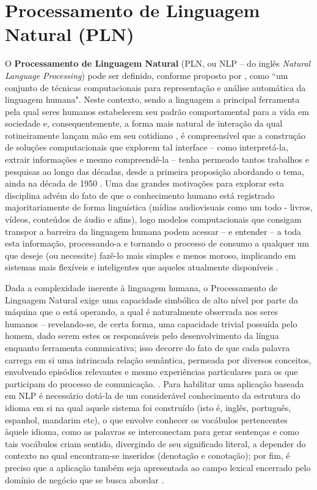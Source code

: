 \section{Processamento de Linguagem Natural (PLN)}
\label{sec:npl}

O \textbf{Processamento de Linguagem Natural} (PLN, ou NLP -- do inglês \textit{Natural Language Processing}) pode ser definido, conforme proposto por , como ``um conjunto de técnicas computacionais para representação e análise automática da linguagem humana". Neste contexto, sendo a linguagem a principal ferramenta pela qual seres humanos estabelecem seu padrão comportamental para a vida em sociedade e, consequentemente, a forma mais natural de interação da qual rotineiramente lançam mão em seu cotidiano \cite{allen1988natural}, é compreensível que a construção de soluções computacionais que explorem tal interface -- como interpretá-la, extrair informações e mesmo compreendê-la -- tenha permeado tantos trabalhos e pesquisas ao longo das décadas, desde a primeira proposição abordando o tema, ainda na década de 1950 \cite{cambria2014jumping}. Uma das grandes motivações para explorar esta disciplina advém do fato de que o conhecimento humano está registrado majoritariamente de forma linguística (mídias audiovisuais como um todo - livros, vídeos, conteúdos de áudio e afins), logo modelos computacionais que consigam transpor a barreira da linguagem humana podem acessar -- e entender -- a toda esta informação, processando-a e tornando o processo de consumo a qualquer um que deseje (ou necessite) fazê-lo mais simples e menos moroso, implicando em sistemas mais flexíveis e inteligentes que aqueles atualmente disponíveis \cite{allen1988natural}.

Dada a complexidade inerente à linguagem humana, o Processamento de Linguagem Natural exige uma capacidade simbólica de alto nível por parte da máquina que o está operando, a qual é naturalmente observada nos seres humanos -- revelando-se, de certa forma, uma capacidade trivial possuída pelo homem, dado serem estes os responsáveis pelo desenvolvimento da língua enquanto ferramenta comunicativa; isso decorre do fato de que cada palavra carrega em si uma intrincada relação semântica, permeada por diversos conceitos, envolvendo episódios relevantes e mesmo experiências particulares para os que participam do processo de comunicação. \cite{cambria2014jumping}. Para habilitar uma aplicação baseada em NLP é necessário dotá-la de um considerável conhecimento da estrutura do idioma em si na qual aquele sistema foi construído (isto é, inglês, português, espanhol, mandarim etc), o que envolve conhecer os vocábulos pertencentes àquele idioma, como as palavras se interconectam para gerar sentenças e como tais vocábulos criam sentido, divergindo de seu significado literal, a depender do contexto no qual encontram-se inseridos (denotação e conotação); por fim, é preciso que a aplicação também seja apresentada ao campo lexical encerrado pelo domínio de negócio que se busca abordar \cite{allen1988natural}.

